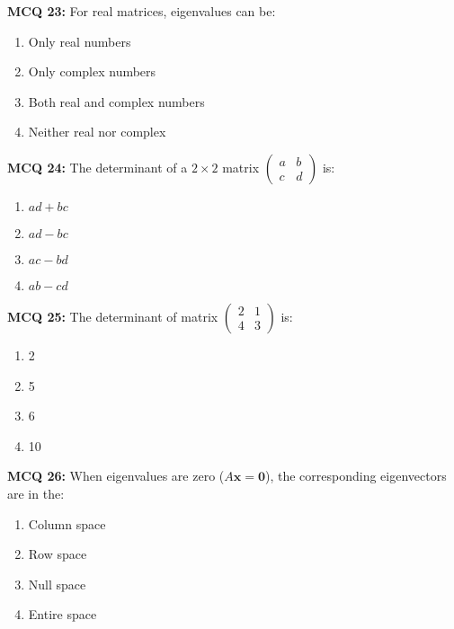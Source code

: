 \documentclass[11pt,a4paper]{article}
\theoremstyle{definition}
\begin{document}
\noindent \textbf{MCQ 23:} For real matrices, eigenvalues can be:

\begin{enumerate}
    \item Only real numbers
    \item Only complex numbers
    \item Both real and complex numbers
    \item Neither real nor complex
\end{enumerate}

\noindent \textbf{MCQ 24:} The determinant of a $2 \times 2$ matrix $\begin{pmatrix} a & b \\ c & d \end{pmatrix}$ is:

\begin{enumerate}
    \item $ad + bc$
    \item $ad - bc$
    \item $ac - bd$
    \item $ab - cd$
\end{enumerate}

\noindent \textbf{MCQ 25:} The determinant of matrix $\begin{pmatrix} 2 & 1 \\ 4 & 3 \end{pmatrix}$ is:

\begin{enumerate}
    \item 2
    \item 5
    \item 6
    \item 10
\end{enumerate}

\noindent \textbf{MCQ 26:} When eigenvalues are zero ($A\mathbf{x} = \mathbf{0}$), 
the corresponding eigenvectors are in the:

\begin{enumerate}
    \item Column space
    \item Row space
    \item Null space
    \item Entire space
\end{enumerate}
\end{document}
